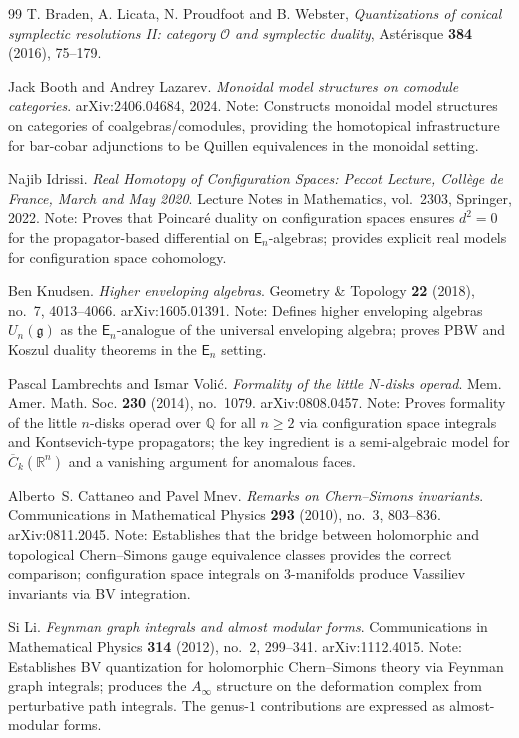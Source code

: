 \begin{thebibliography}{99}
 T. Braden, A. Licata, N. Proudfoot and B. Webster, \emph{Quantizations of conical symplectic resolutions II: category $\mathcal{O}$ and symplectic duality}, Ast\'erisque \textbf{384} (2016), 75--179.

Jack Booth and Andrey Lazarev.
\textit{Monoidal model structures on comodule categories}.
arXiv:2406.04684, 2024.
Note: Constructs monoidal model structures on categories of
coalgebras/comodules, providing the homotopical infrastructure
for bar-cobar adjunctions to be Quillen equivalences in the
monoidal setting.


Najib Idrissi.
\textit{Real Homotopy of Configuration Spaces: Peccot Lecture,
Coll\`ege de France, March and May 2020}.
Lecture Notes in Mathematics, vol.~2303, Springer, 2022.
Note: Proves that Poincar\'e duality on configuration spaces
ensures $d^2 = 0$ for the propagator-based differential on
$\mathsf{E}_n$-algebras; provides explicit real models for
configuration space cohomology.

Ben Knudsen.
\textit{Higher enveloping algebras}.
Geometry \& Topology \textbf{22} (2018), no.~7, 4013--4066.
arXiv:1605.01391.
Note: Defines higher enveloping algebras $U_n(\mathfrak{g})$ as
the $\mathsf{E}_n$-analogue of the universal enveloping algebra;
proves PBW and Koszul duality theorems in the $\mathsf{E}_n$ setting.

Pascal Lambrechts and Ismar Voli\'c.
\textit{Formality of the little $N$-disks operad}.
Mem. Amer. Math. Soc. \textbf{230} (2014), no.~1079.
arXiv:0808.0457.
Note: Proves formality of the little $n$-disks operad over $\mathbb{Q}$
for all $n \geq 2$ via configuration space integrals and
Kontsevich-type propagators; the key ingredient is a semi-algebraic
model for $\overline{C}_k(\mathbb{R}^n)$ and a vanishing argument
for anomalous faces.


Alberto~S. Cattaneo and Pavel Mnev.
\textit{Remarks on Chern--Simons invariants}.
Communications in Mathematical Physics \textbf{293} (2010), no.~3, 803--836.
arXiv:0811.2045.
Note: Establishes that the bridge between holomorphic and topological
Chern--Simons gauge equivalence classes provides the correct comparison;
configuration space integrals on $3$-manifolds produce Vassiliev invariants
via BV integration.


Si Li.
\textit{Feynman graph integrals and almost modular forms}.
Communications in Mathematical Physics \textbf{314} (2012), no.~2, 299--341.
arXiv:1112.4015.
Note: Establishes BV quantization for holomorphic Chern--Simons theory
via Feynman graph integrals; produces the $A_\infty$ structure on the
deformation complex from perturbative path integrals.  The genus-$1$
contributions are expressed as almost-modular forms.


\end{thebibliography}

